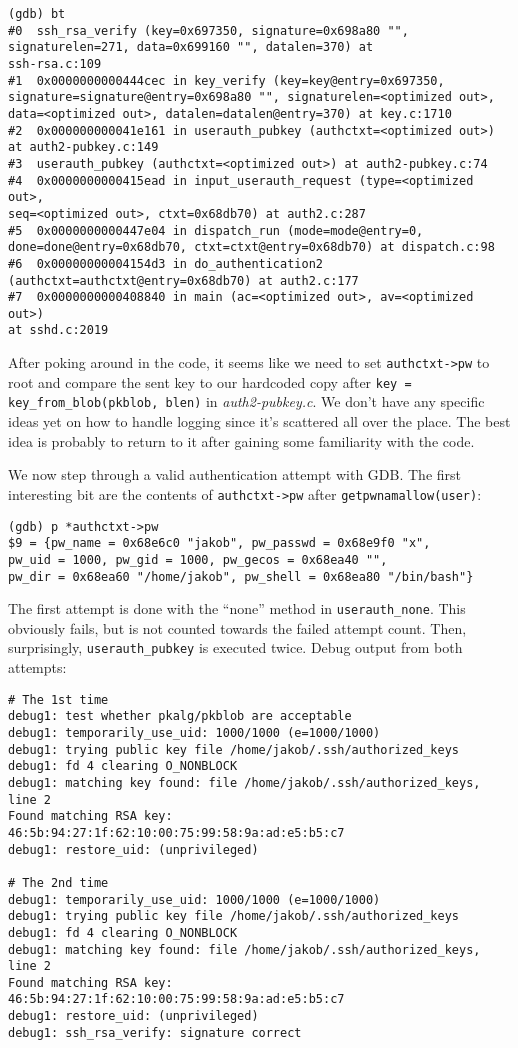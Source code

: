 \documentclass[a4paper,10pt]{article}
\begin{document}
\begin{verbatim}
(gdb) bt
#0  ssh_rsa_verify (key=0x697350, signature=0x698a80 "", 
signaturelen=271, data=0x699160 "", datalen=370) at 
ssh-rsa.c:109
#1  0x0000000000444cec in key_verify (key=key@entry=0x697350, 
signature=signature@entry=0x698a80 "", signaturelen=<optimized out>, 
data=<optimized out>, datalen=datalen@entry=370) at key.c:1710
#2  0x000000000041e161 in userauth_pubkey (authctxt=<optimized out>) 
at auth2-pubkey.c:149
#3  userauth_pubkey (authctxt=<optimized out>) at auth2-pubkey.c:74
#4  0x0000000000415ead in input_userauth_request (type=<optimized out>, 
seq=<optimized out>, ctxt=0x68db70) at auth2.c:287
#5  0x0000000000447e04 in dispatch_run (mode=mode@entry=0, 
done=done@entry=0x68db70, ctxt=ctxt@entry=0x68db70) at dispatch.c:98
#6  0x00000000004154d3 in do_authentication2 
(authctxt=authctxt@entry=0x68db70) at auth2.c:177
#7  0x0000000000408840 in main (ac=<optimized out>, av=<optimized out>) 
at sshd.c:2019
\end{verbatim}

After poking around in the code, it seems like we need to set 
\lstinline|authctxt->pw| to root and compare the sent key to our
hardcoded copy after \lstinline|key = key_from_blob(pkblob, blen)|
in \emph{auth2-pubkey.c}. We don't have any specific ideas yet on how to handle
logging since it's scattered all over the place. The best idea is probably
to return to it after gaining some familiarity with the code.

We now step through a valid authentication attempt with GDB. The first interesting
bit are the contents of \lstinline|authctxt->pw| after \lstinline|getpwnamallow(user)|:

\begin{verbatim}
(gdb) p *authctxt->pw
$9 = {pw_name = 0x68e6c0 "jakob", pw_passwd = 0x68e9f0 "x",
pw_uid = 1000, pw_gid = 1000, pw_gecos = 0x68ea40 "",
pw_dir = 0x68ea60 "/home/jakob", pw_shell = 0x68ea80 "/bin/bash"}
\end{verbatim}

The first attempt is done with the ``none'' method in \lstinline|userauth_none|.
This obviously fails, but is not counted towards the failed attempt count.
Then, surprisingly, \lstinline|userauth_pubkey| is executed twice. Debug output
from both attempts:

\begin{verbatim}
# The 1st time
debug1: test whether pkalg/pkblob are acceptable
debug1: temporarily_use_uid: 1000/1000 (e=1000/1000)
debug1: trying public key file /home/jakob/.ssh/authorized_keys
debug1: fd 4 clearing O_NONBLOCK
debug1: matching key found: file /home/jakob/.ssh/authorized_keys,
line 2
Found matching RSA key:
46:5b:94:27:1f:62:10:00:75:99:58:9a:ad:e5:b5:c7
debug1: restore_uid: (unprivileged)

# The 2nd time
debug1: temporarily_use_uid: 1000/1000 (e=1000/1000)
debug1: trying public key file /home/jakob/.ssh/authorized_keys
debug1: fd 4 clearing O_NONBLOCK
debug1: matching key found: file /home/jakob/.ssh/authorized_keys,
line 2
Found matching RSA key:
46:5b:94:27:1f:62:10:00:75:99:58:9a:ad:e5:b5:c7
debug1: restore_uid: (unprivileged)
debug1: ssh_rsa_verify: signature correct
\end{verbatim}
\end{document}
